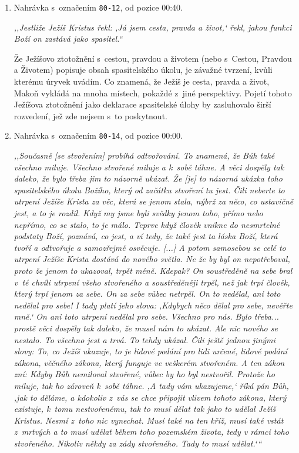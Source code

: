 \begin{enumerate}

\item{
Nahrávka s~označením \texttt{80-12}, od pozice 00:40.

\textit{%
,,Jestliže Ježíš Kristus řekl: ,Já jsem cesta, pravda a život,` řekl, jakou
funkci Boží on zastává jako spasitel.``
}

Že Ježíšovo ztotožnění s~cestou, pravdou a životem
(nebo s~Cestou, Pravdou a Životem)
popisuje obsah spasitelského úkolu, je závažné tvrzení, kvůli kterému úryvek
uvádím. Co znamená, že Ježíš je cesta, pravda a život, Makoň vykládá na mnoha
místech, pokaždé z~jiné perspektivy. Pojetí tohoto Ježíšova ztotožnění jako
        deklarace spasitelské úlohy by zasluhovalo širší rozvedení, jež zde
        nejsem s~to poskytnout.

}

\item{
Nahrávka s~označením \texttt{80-14}, od pozice 00:00.

\textit{%
,,Současně [se stvořením] probíhá odtvořování. To znamená, že Bůh také všechno miluje. Všechno
stvořené miluje a k~sobě táhne. A věci dospěly tak daleko, že bylo třeba jim to
názorně ukázat. Že [je] to názorná ukázka toho spasitelského úkolu Božího, který
od začátku stvoření tu jest. Čili neberte to utrpení Ježíše Krista za věc, která
se jenom stala, nýbrž za něco, co ustavičně jest, a to je rozdíl. Když my jsme
byli svědky jenom toho, přímo nebo nepřímo, co se stalo, to je málo. Teprve když
člověk vnikne do nesmrtelné podstaty Boží, poznává, co jest, a ví tedy, že také
jest ta láska Boží, která tvoří a odtvořuje a samozřejmě osvěcuje. [...] A potom
samosebou se celé to utrpení Ježíše Krista dostává do nového světla. Ne že by
byl on nepotřeboval, proto že jenom to ukazoval, trpět méně. Kdepak? On
soustředěně na sebe bral v~té chvíli utrpení všeho stvořeného a soustředěněji
trpěl, než jak trpí člověk, který trpí jenom za sebe. On za sebe vůbec netrpěl.
On to nedělal, ani toto nedělal pro sebe! I tady platí jeho slova: ,Kdybych něco
dělal pro sebe, nevěřte mně.` On ani toto utrpení nedělal pro sebe. Všechno pro
nás. Bylo třeba... prostě věci dospěly tak daleko, že musel nám to ukázat. Ale
nic nového se nestalo. To všechno jest a trvá. To tehdy ukázal. Čili ještě
jednou jinými slovy: To, co Ježíš ukazuje, to je lidové podání pro lidi určené,
lidové podání zákona, věčného zákona, který funguje ve veškerém stvořeném. A ten
zákon zní: Kdyby Bůh nemiloval stvořené, vůbec by ho byl nestvořil. Protože ho
miluje, tak ho zároveň k~sobě táhne. ,A tady vám ukazujeme,` říká pán Bůh, ,jak
to děláme, a kdokoliv z~vás se chce připojit vlivem tohoto zákona, který
existuje, k~tomu nestvořenému, tak to musí dělat tak jako to udělal Ježíš
Kristus. Nesmí z~toho nic vynechat. Musí také na ten kříž, musí také vstát
z~mrtvých a to musí udělat během toho pozemském života, tedy v rámci toho
stvořeného. Nikoliv někdy za zády stvořeného. Tady to musí udělat.`{}``
}

}
\end{enumerate}
